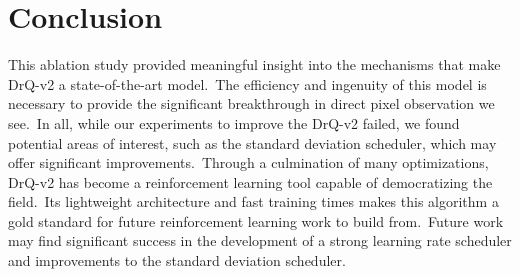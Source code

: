 \documentclass[conference]{./IEEEtran/IEEEtran} %
\begin{document}
    \section{Conclusion}\label{sec:conclusion}

    This ablation study provided meaningful insight into the mechanisms that make DrQ-v2 a state-of-the-art model.\ The efficiency
    and ingenuity of this model is necessary to provide the significant breakthrough in direct pixel observation we see.\ In all,
    while our experiments to improve the DrQ-v2 failed, we found potential areas of interest, such as the standard deviation
    scheduler, which may offer significant improvements.\ Through a culmination of many optimizations, DrQ-v2 has become a
    reinforcement learning tool capable of democratizing the field.\ Its lightweight architecture and fast training times makes
    this algorithm a gold standard for future reinforcement learning work to build from.\ Future work may find significant success
    in the development of a strong learning rate scheduler and improvements to the standard deviation scheduler.\

    
    
\end{document}
